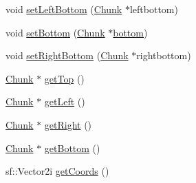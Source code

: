 \begin{DoxyCompactItemize}
\item 
void \hyperlink{class_chunk_a690d801cad525f106f11fca76855c785}{set\-Left\-Bottom} (\hyperlink{class_chunk}{Chunk} $\ast$leftbottom)
\item 
void \hyperlink{class_chunk_a57c85ac8a8959eca362b7c3e64dc1d0d}{set\-Bottom} (\hyperlink{class_chunk}{Chunk} $\ast$\hyperlink{_chunk_8hpp_ab91b34ae619fcdfcba4522b4f335bf83a692ac8f8a4a43ac2513ce4cd90dc3ebe}{bottom})
\item 
void \hyperlink{class_chunk_aadab4832f4d1c4618b7232a1503d8aed}{set\-Right\-Bottom} (\hyperlink{class_chunk}{Chunk} $\ast$rightbottom)
\item 
\hyperlink{class_chunk}{Chunk} $\ast$ \hyperlink{class_chunk_a161929ca5dcfa0e1a798999f989fe2f8}{get\-Top} ()
\item 
\hyperlink{class_chunk}{Chunk} $\ast$ \hyperlink{class_chunk_a43c3b2b5995d06baec16ab9935a315fa}{get\-Left} ()
\item 
\hyperlink{class_chunk}{Chunk} $\ast$ \hyperlink{class_chunk_ad13a4e8ac481c7de6a70b3fa461418cf}{get\-Right} ()
\item 
\hyperlink{class_chunk}{Chunk} $\ast$ \hyperlink{class_chunk_a59eb282f08711420c1e966e30aab47e3}{get\-Bottom} ()
\item 
sf\-::\-Vector2i \hyperlink{class_chunk_ad8d9253e661bbaef3471b73b86f0d8c4}{get\-Coords} ()
\end{DoxyCompactItemize}
